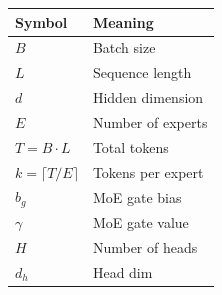 \begin{table}[H]
\centering
\small
\begin{tabular}{ll}
\toprule
\textbf{Symbol} & \textbf{Meaning} \\
\midrule
$B$ & Batch size \\
$L$ & Sequence length \\
$d$ & Hidden dimension \\
$E$ & Number of experts \\
$T = B \cdot L$ & Total tokens \\
$k = \lceil T / E \rceil$ & Tokens per expert \\
$b_g$ & MoE gate bias \\
$\gamma$ & MoE gate value \\
$H$ & Number of heads \\
$d_h$ & Head dim \\
\bottomrule
\end{tabular}
\end{table}


